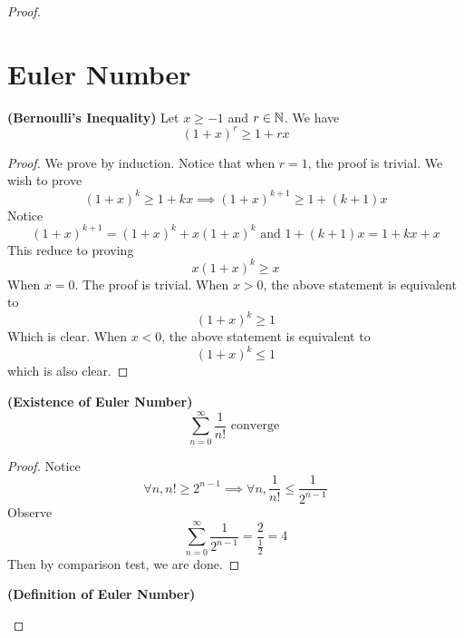 \documentclass{report}
\begin{document}
\begin{proof}
\section{Euler Number}
\begin{lemma}
\label{4.4.1}
\textbf{(Bernoulli's Inequality)} 
Let $x\geq -1$ and $r\in\mathbb{N}$. We have
\begin{equation}
  (1+x)^r\geq 1+rx
\end{equation}
\end{lemma}
\begin{proof}
We prove by induction. Notice that when $r=1$, the proof is trivial. We wish to prove
\begin{equation}
  (1+x)^k \geq 1+kx\implies (1+x)^{k+1}\geq 1+(k+1)x
\end{equation}
Notice
\begin{equation}
  (1+x)^{k+1}=(1+x)^k +x(1+x)^k\text{ and }1+(k+1)x=1+kx+x
\end{equation}
This reduce to proving 
\begin{equation}
x(1+x)^k \geq x
\end{equation}
When $x=0$. The proof is trivial. When  $x>0$, the above statement is equivalent to 
 \begin{equation}
   (1+x)^k\geq 1
\end{equation}
Which is clear. When $x<0$, the above statement is equivalent to 
 \begin{equation}
   (1+x)^k\leq 1
\end{equation}
which is also clear.
\end{proof}
\begin{theorem}
\label{4.4.2}
\textbf{(Existence of Euler Number)} 
\begin{equation}
\sum_{n=0}^\infty \frac{1}{n!}\text{ converge }
\end{equation}
\end{theorem}
\begin{proof}
Notice 
\begin{equation}
\forall n, n!\geq 2^{n-1}\implies \forall n,\frac{1}{n!}\leq \frac{1}{2^{n-1}}
\end{equation}
Observe 
\begin{equation}
\sum_{n=0}^\infty  \frac{1}{2^{n-1}}=\frac{2}{\frac{1}{2}}=4
\end{equation}
Then by comparison test, we are done. 
\end{proof}
\begin{definition}
\label{4.4.3}
\textbf{(Definition of Euler Number)}
\begin{equation}

\end{equation}
\end{definition}
\end{proof}
\end{document}
